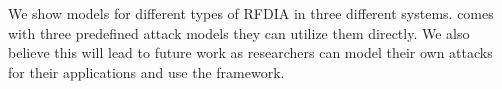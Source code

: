 We show models for different types of RFDIA in three different systems. \tool comes with three predefined attack models they can utilize them directly. We also believe this will lead to future work as researchers can model their own attacks for their applications and use the framework. 



